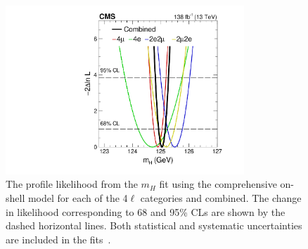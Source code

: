 \begin{figure}[!hbt]
  \centering
  \includegraphics[width=0.8\textwidth]{figures/Figure_008.pdf}
  \caption{The profile likelihood from the $m_H$ fit using the comprehensive on-shell model for each of the 4$\ell$ categories and combined.  The change in likelihood corresponding to 68 and 95\% CLs are shown by the dashed horizontal lines. Both statistical and systematic uncertainties are included in the fits~\cite{PhysRevD.111.092014}.}
  \label{MassLikelihoodScan}
\end{figure}


